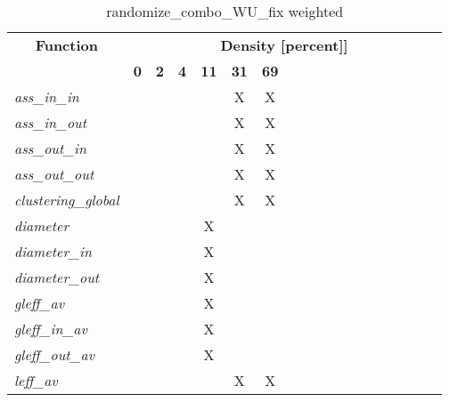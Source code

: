 \begin{table}[h] \centering \begin{tabular}{|l|c|c|c|c|c|c|} \hline\multicolumn{1}{|c|}{\textbf{\large{Function}}} & \multicolumn{17}{c|}{\large{\textbf{Density [percent]]}}}\\\cline{2-18}  & \textbf{0} &  \textbf{2} &  \textbf{4} &  \textbf{11} &  \textbf{31} &  \textbf{69} \\ \hline   \textit{ass\_in\_in} &   &   &   &   & X & X \\ \hline  \textit{ass\_in\_out} &   &   &   &   & X & X \\ \hline  \textit{ass\_out\_in} &   &   &   &   & X & X \\ \hline  \textit{ass\_out\_out} &   &   &   &   & X & X \\ \hline  \textit{clustering\_global} &   &   &   &   & X & X \\ \hline  \textit{diameter} &   &   &   & X &   &   \\ \hline  \textit{diameter\_in} &   &   &   & X &   &   \\ \hline  \textit{diameter\_out} &   &   &   & X &   &   \\ \hline  \textit{gleff\_av} &   &   &   & X &   &   \\ \hline  \textit{gleff\_in\_av} &   &   &   & X &   &   \\ \hline  \textit{gleff\_out\_av} &   &   &   & X &   &   \\ \hline  \textit{leff\_av} &   &   &   &   & X & X \\ \hline \end{tabular}\caption{randomize\_combo\_WU\_fix weighted}\label{tab:my_label} \end{table}